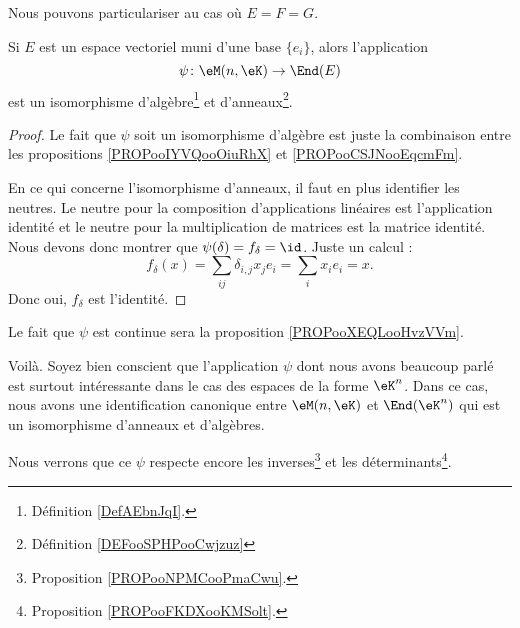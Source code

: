 Nous pouvons particulariser au cas où \( E=F=G\).
\begin{proposition}     \label{PROPooFMBFooEVCLKA}
	Si \( E\) est un espace vectoriel muni d'une base \( \{ e_i \}\), alors l'application
	\begin{equation}
		\psi\colon \eM(n,\eK)\to \End(E)
	\end{equation}
	est un isomorphisme d'algèbre\footnote{Définition \ref{DefAEbnJqI}.} et d'anneaux\footnote{Définition \ref{DEFooSPHPooCwjzuz}}.
\end{proposition}

\begin{proof}
	Le fait que \( \psi\) soit un isomorphisme d'algèbre est juste la combinaison entre les propositions \ref{PROPooIYVQooOiuRhX} et \ref{PROPooCSJNooEqcmFm}.

	En ce qui concerne l'isomorphisme d'anneaux, il faut en plus identifier les neutres. Le neutre pour la composition d'applications linéaires est l'application identité et le neutre pour la multiplication de matrices est la matrice identité. Nous devons donc montrer que \( \psi(\delta)=f_{\delta}=\id\). Juste un calcul :
	\begin{equation}
		f_{\delta}(x)=\sum_{ij}\delta_{i,j}x_je_i=\sum_ix_ie_i=x.
	\end{equation}
	Donc oui, \( f_{\delta}\) est l'identité.
\end{proof}

Le fait que \( \psi\) est continue sera la proposition \ref{PROPooXEQLooHvzVVm}.


Voilà. Soyez bien conscient que l'application \( \psi\) dont nous avons beaucoup parlé est surtout intéressante dans le cas des espaces de la forme \( \eK^n\). Dans ce cas, nous avons une identification canonique entre \( \eM(n,\eK)\) et \( \End(\eK^n)\) qui est un isomorphisme d'anneaux et d'algèbres.

Nous verrons que ce \( \psi\) respecte encore les inverses\footnote{Proposition \ref{PROPooNPMCooPmaCwu}.} et les déterminants\footnote{Proposition \ref{PROPooFKDXooKMSolt}.}.

